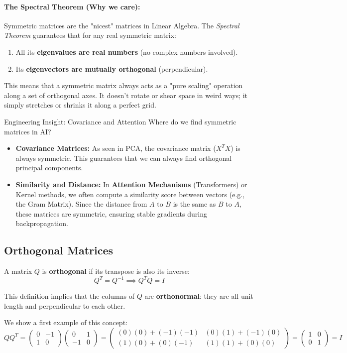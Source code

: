 \documentclass[12pt,a4paper,twoside,openright]{book}
\begin{document}
\paragraph{The Spectral Theorem (Why we care):}
Symmetric matrices are the "nicest" matrices in Linear Algebra. The \textit{Spectral Theorem} guarantees that for any real symmetric matrix:
\begin{enumerate}
    \item All its \textbf{eigenvalues are real numbers} (no complex numbers involved).
    \item Its \textbf{eigenvectors are mutually orthogonal} (perpendicular).
\end{enumerate}

This means that a symmetric matrix always acts as a "pure scaling" operation along a set of orthogonal axes. It doesn't rotate or shear space in weird ways; it simply stretches or shrinks it along a perfect grid.

\begin{unibobox}{Engineering Insight: Covariance and Attention}
Where do we find symmetric matrices in AI?
\begin{itemize}
    \item \textbf{Covariance Matrices:} As seen in PCA, the covariance matrix ($X^T X$) is always symmetric. This guarantees that we can always find orthogonal principal components.
    \item \textbf{Similarity and Distance:} In \textbf{Attention Mechanisms} (Transformers) or Kernel methods, we often compute a similarity score between vectors (e.g., the Gram Matrix). Since the distance from $A$ to $B$ is the same as $B$ to $A$, these matrices are symmetric, ensuring stable gradients during backpropagation.
\end{itemize}
\end{unibobox}

\subsection{Orthogonal Matrices}

A matrix $Q$ is \textbf{orthogonal} if its transpose is also its inverse:
\[ Q^T = Q^{-1} \implies Q^T Q = I \]

This definition implies that the columns of $Q$ are \textbf{orthonormal}: they are all unit length and perpendicular to each other.

We show a first example of this concept:
$$
Q Q^T = 
\begin{pmatrix} 0 & -1 \\ 1 & 0 \end{pmatrix} 
\begin{pmatrix} 0 & 1 \\ -1 & 0 \end{pmatrix} = 
\begin{pmatrix} 
(0)(0) + (-1)(-1) & (0)(1) + (-1)(0) \\ 
(1)(0) + (0)(-1) & (1)(1) + (0)(0) 
\end{pmatrix} = 
\begin{pmatrix} 1 & 0 \\ 0 & 1 \end{pmatrix} = I
$$
\end{document}

